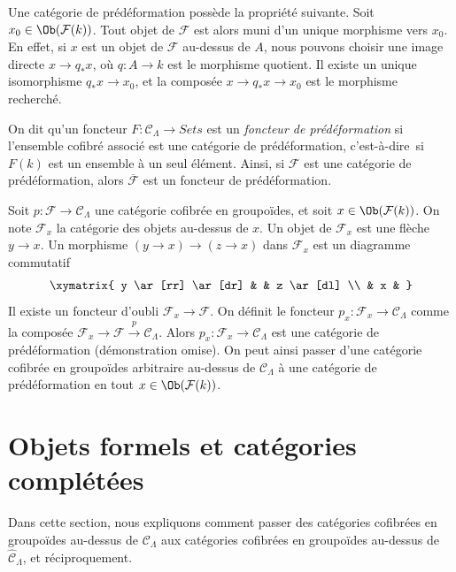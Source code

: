 \noindent
Une catégorie de prédéformation possède la propriété suivante.
Soit $x_0 \in \Ob(\mathcal{F}(k))$. Tout objet de $\mathcal{F}$ est alors
muni d'un unique morphisme vers $x_0$. En effet, si $x$ est un objet de
$\mathcal{F}$ au-dessus de $A$, nous pouvons choisir une image directe
$x \to q_*x$, où $q : A \to k$ est le morphisme quotient. Il existe un unique
isomorphisme $q_*x \to x_0$, et la composée $x \to q_*x \to x_0$ est le
morphisme recherché.

\begin{remark}
\label{remark-predeformation-functor}
On dit qu'un foncteur $F: \mathcal{C}_\Lambda \to \textit{Sets}$ est un
{\it foncteur de prédéformation} si l'ensemble cofibré associé est une
catégorie de prédéformation, c'est-à-dire\ si $F(k)$ est un ensemble à un
seul élément. Ainsi,
si $\mathcal{F}$ est une catégorie de prédéformation, alors
$\overline{\mathcal{F}}$ est un foncteur de prédéformation.
\end{remark}

\begin{remark}
\label{remark-localize-cofibered-groupoid}
Soit $p : \mathcal{F} \to \mathcal{C}_\Lambda$ une catégorie cofibrée en
groupoïdes, et soit $x \in \Ob(\mathcal{F}(k))$. On note
$\mathcal{F}_x$ la catégorie des objets au-dessus de $x$.
Un objet de $\mathcal{F}_x$ est une flèche $y \to x$.
Un morphisme $(y \to x) \to (z \to x)$ dans $\mathcal{F}_x$ est un diagramme
commutatif
$$
\xymatrix{
y \ar[rr] \ar[dr] & & z \ar[dl] \\
& x &
}
$$
Il existe un foncteur d'oubli $\mathcal{F}_x \to \mathcal{F}$. On définit le
foncteur $p_x : \mathcal{F}_x \to \mathcal{C}_\Lambda$ comme la composée
$\mathcal{F}_x \to \mathcal{F} \xrightarrow{p} \mathcal{C}_\Lambda$.
Alors $p_x : \mathcal{F}_x \to \mathcal{C}_\Lambda$ est une catégorie de
prédéformation (démonstration omise). On peut ainsi passer d'une catégorie
cofibrée en groupoïdes arbitraire au-dessus de $\mathcal{C}_\Lambda$ à une
catégorie de prédéformation en tout $x \in \Ob(\mathcal{F}(k))$.
\end{remark}






\section{Objets formels et catégories complétées}
\label{section-formal-objects}

\noindent
Dans cette section, nous expliquons comment passer des catégories cofibrées
en groupoïdes au-dessus de $\mathcal{C}_\Lambda$ aux catégories cofibrées en
groupoïdes au-dessus de $\widehat{\mathcal{C}}_\Lambda$, et réciproquement.


